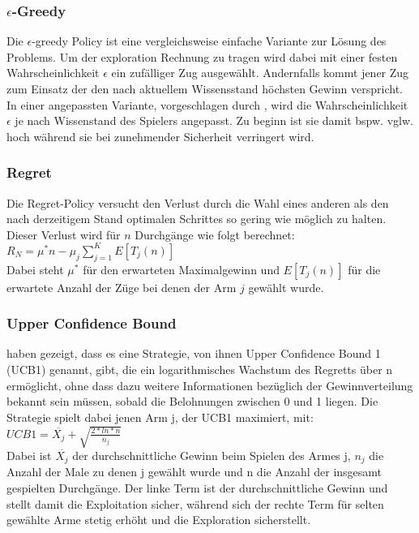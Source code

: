 \subsubsection{$\epsilon$-Greedy}
Die $\epsilon$-greedy Policy ist eine vergleichsweise einfache Variante zur Lösung des Problems. Um der exploration Rechnung zu tragen wird dabei mit einer festen Wahrscheinlichkeit $\epsilon$ ein zufälliger Zug ausgewählt. Andernfalls kommt jener Zug zum Einsatz der den nach aktuellem Wissensstand höchsten Gewinn verspricht. In einer angepassten Variante, vorgeschlagen durch \cite{Tokic.2010}, wird die Wahrscheinlichkeit $\epsilon$ je nach Wissenstand des Spielers angepasst. Zu beginn ist sie damit bspw. vglw. hoch während sie bei zunehmender Sicherheit verringert wird.
\subsubsection{Regret}
Die Regret-Policy versucht den Verlust durch die Wahl eines anderen als den nach derzeitigem Stand optimalen Schrittes so gering wie möglich zu halten. Dieser Verlust wird für $n$ Durchgänge wie folgt berechnet:\\
$R_{N} = \mu^{*}n-\mu_{j} \sum\limits_{j=1}^{K} E[T_{j}(n)]$\\
Dabei steht $\mu^{*}$ für den erwarteten Maximalgewinn und $E[T_{j}(n)]$ für die erwartete Anzahl der Züge bei denen der Arm $j$ gewählt wurde.
\subsubsection{Upper Confidence Bound}
\cite{Auer.2002} haben gezeigt, dass es eine Strategie, von ihnen Upper Confidence Bound 1 (UCB1) genannt, gibt, die ein logarithmisches Wachstum des Regretts über n ermöglicht, ohne dass dazu weitere Informationen bezüglich der Gewinnverteilung bekannt sein müssen, sobald die Belohnungen zwischen 0 und 1 liegen. Die Strategie spielt dabei jenen Arm j, der UCB1 maximiert, mit:\\
$UCB1 = \overline{X_{j}}+\sqrt{\frac{2*ln*n}{n_{j}}}$\\
Dabei ist $\overline{X_{j}}$ der durchschnittliche Gewinn beim Spielen des Armes j, $n_{j}$ die Anzahl der Male zu denen j gewählt wurde und n die Anzahl der insgesamt gespielten Durchgänge. Der linke Term ist der durchschnittliche Gewinn und stellt damit die Exploitation sicher, während sich der rechte Term für selten gewählte Arme stetig erhöht und die Exploration sicherstellt.